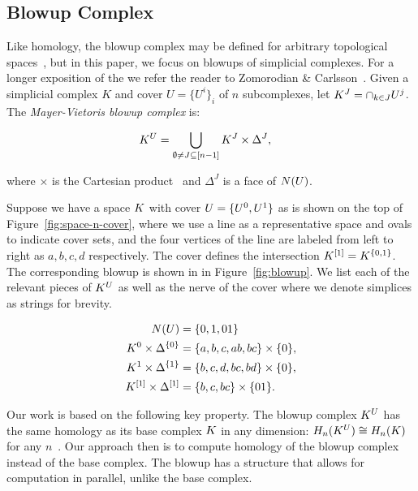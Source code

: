 \documentclass{jocg}
\begin{document}
\subsection{Blowup Complex}

Like homology, the blowup complex may be defined for arbitrary topological 
spaces~\cite{zc-lh-08}, but in this paper, we focus on blowups of simplicial 
complexes. For a longer exposition of the \mvb{} we refer the reader to Zomorodian
\& Carlsson~\cite{zc-lh-08}. Given a simplicial complex $K$ and cover 
$U = \{U^i\}_i$ of $n$ subcomplexes, let 
$K^J = \cap_{k \in J} U^j$. The \emph{Mayer-Vietoris blowup complex} is:
\begin{linenomath*}
\begin{align*}
K^U &= \bigcup_{\emptyset \not = J \subseteq [n-1]} K^J \times \Delta^J,
\end{align*}
\end{linenomath*}
where $\times$ is the Cartesian product~\cite{zc-lh-08} and $\Delta^J$ is a face of $N(U)$.
\begin{example}
\label{ex:blowup}
Suppose we have a space $K$ with cover $U = \{ U^0, U^1 \}$ as is shown on 
the top of Figure~\ref{fig:space-n-cover}, where we use a line as a 
representative space and ovals to indicate cover sets, and the four vertices
of the line are labeled from left to right as $a, b, c, d$ respectively.
The cover defines the intersection $K^{[1]} = K^{ \{ 0 , 1 \} }$. 
The corresponding blowup is shown in in Figure~\ref{fig:blowup}. We list each of
the relevant pieces of $K^{U}$ as well as the nerve of the cover where we denote simplices as strings for 
brevity.  
\begin{linenomath*}
\begin{align*}
N(U) &= \{ 0, 1, 01 \} \\
K^0 \times \Delta^{\{0\}} &= \{a,b,c,ab,bc\} \times \{0\}, \\
K^1 \times \Delta^{\{1\}} &= \{b,c,d,bc,bd\} \times \{0\}, \\
K^{[1]} \times \Delta^{[1]} &=\{b,c,bc\} \times \{01\}. 
\end{align*}
\end{linenomath*}
\end{example}

Our work is based on the following key property.
The blowup complex $K^U$ has the same homology as its base complex $K$ in any 
dimension: $H_n(K^U) \cong H_n(K)$ for any $n$~\cite[Lemma 1]{zc-lh-08}. 
Our approach then is to compute homology of the blowup complex 
instead of the base complex. The blowup has a structure that allows 
for computation in parallel, unlike the base complex.
\end{document}
